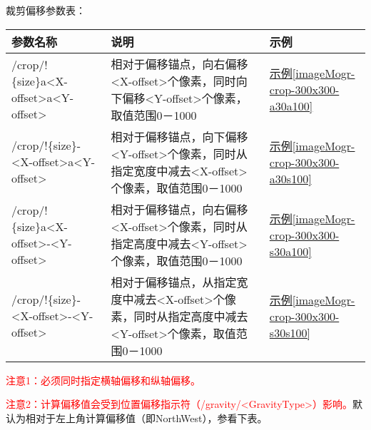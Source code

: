 \documentclass[11pt, oneside]{book}
\newcommand{\qpara}[1]{
\vspace{0.3em}
\noindent
#1\par
\vspace{0.3em}
}
\newcommand{\qtable}[1]{\footnotesize\vspace{0.5em}#1\vspace{0.5em}\normalsize}
\newcommand{\qsample}[1]{\hyperref[#1]{示例\ref*{#1}}}
\begin{document}
\qpara{裁剪偏移参数表：}
\qtable{
\label{crop-offset-spec}
\begin{tabular}[t]{|l|p{16em}|p{5em}|}
\hline
参数名称 & 说明 & 示例 \\
\hline
/crop/!\{size\}a\textless X-offset\textgreater a\textless Y-offset\textgreater & 相对于偏移锚点，向右偏移\textless X-offset\textgreater 个像素，同时向下偏移\textless Y-offset\textgreater 个像素，取值范围0－1000 & \qsample{imageMogr-crop-300x300-a30a100} \\
\hline
/crop/!\{size\}-\textless X-offset\textgreater a\textless Y-offset\textgreater & 相对于偏移锚点，向下偏移\textless Y-offset\textgreater 个像素，同时从指定宽度中减去\textless X-offset\textgreater 个像素，取值范围0－1000 & \qsample{imageMogr-crop-300x300-a30s100} \\
\hline
/crop/!\{size\}a\textless X-offset\textgreater -\textless Y-offset\textgreater & 相对于偏移锚点，向右偏移\textless X-offset\textgreater 个像素，同时从指定高度中减去\textless Y-offset\textgreater 个像素，取值范围0－1000 & \qsample{imageMogr-crop-300x300-s30a100} \\
\hline
/crop/!\{size\}-\textless X-offset\textgreater -\textless Y-offset\textgreater & 相对于偏移锚点，从指定宽度中减去\textless X-offset\textgreater 个像素，同时从指定高度中减去\textless Y-offset\textgreater 个像素，取值范围0－1000 & \qsample{imageMogr-crop-300x300-s30s100} \\
\hline
\end{tabular}
}

\qpara{\textcolor{red}{注意1：必须同时指定横轴偏移和纵轴偏移。}}
\qpara{\textcolor{red}{注意2：计算偏移值会受到位置偏移指示符（/gravity/\textless GravityType\textgreater）影响。}默认为相对于左上角计算偏移值（即NorthWest），参看下表。}

\clearpage
\end{document}
